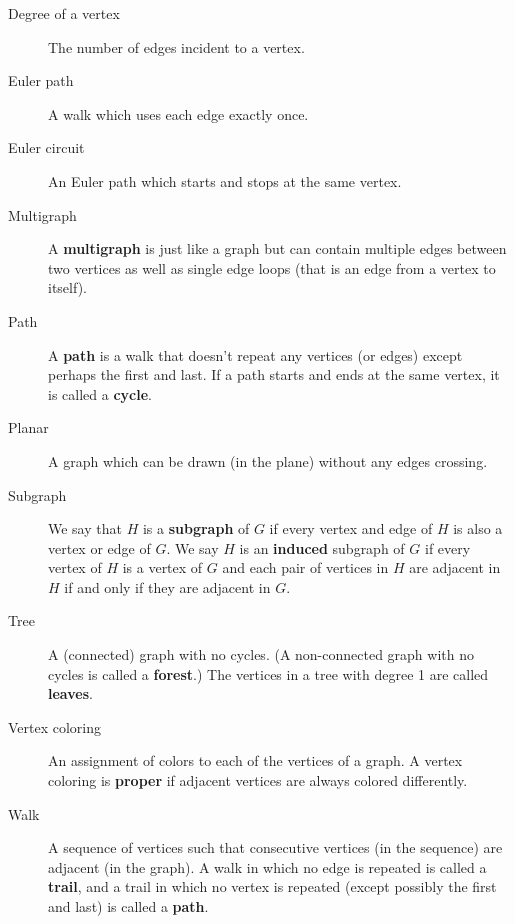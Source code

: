 \documentclass[10pt,]{book}
\newcommand{\terminology}[1]{\textbf{#1}}
\theoremstyle{plain}
\theoremstyle{definition}
\theoremstyle{definition}
\theoremstyle{definition}
\numberwithin{equation}{chapter}
\begin{document}
\begin{description}
\item[{Degree of a vertex}]\hypertarget{li-56}{}\hypertarget{p-1349}{}%
 The number of edges incident to a vertex.%
\item[{Euler path}]\hypertarget{li-57}{}\hypertarget{p-1350}{}%
A walk which uses each edge exactly once.%
\item[{Euler circuit}]\hypertarget{li-58}{}\hypertarget{p-1351}{}%
 An Euler path which starts and stops at the same vertex.%
\item[{Multigraph}]\hypertarget{li-59}{}\hypertarget{p-1352}{}%
 A \terminology{multigraph} is just like a graph but can contain multiple edges between two vertices as well as single edge loops (that is an edge from a vertex to itself).%
\item[{Path}]\hypertarget{li-60}{}\hypertarget{p-1353}{}%
A \terminology{path} is a walk that doesn't repeat any vertices (or edges) except perhaps the first and last.  If a path starts and ends at the same vertex, it is called a \terminology{cycle}.%
\item[{Planar}]\hypertarget{li-61}{}\hypertarget{p-1354}{}%
 A graph which can be drawn (in the plane) without any edges crossing.%
\item[{Subgraph}]\hypertarget{li-62}{}\hypertarget{p-1355}{}%
 We say that \(H\) is a \terminology{subgraph} of \(G\) if every vertex and edge of \(H\) is also a vertex or edge of \(G\). We say \(H\) is an \terminology{induced} subgraph of \(G\) if every vertex of \(H\) is a vertex of \(G\) and each pair of vertices in \(H\) are adjacent in \(H\) if and only if they are adjacent in \(G\).%
\item[{Tree}]\hypertarget{li-63}{}\hypertarget{p-1356}{}%
 A (connected) graph with no cycles. (A non-connected graph with no cycles is called a \terminology{forest}.) The vertices in a tree with degree 1 are called \terminology{leaves}.%
\item[{Vertex coloring}]\hypertarget{li-64}{}\hypertarget{p-1357}{}%
 An assignment of colors to each of the vertices of a graph. A vertex coloring is \terminology{proper} if adjacent vertices are always colored differently.%
\item[{Walk}]\hypertarget{li-65}{}\hypertarget{p-1358}{}%
 A sequence of vertices such that consecutive vertices (in the sequence) are adjacent (in the graph). A walk in which no edge is repeated is called a \terminology{trail}, and a trail in which no vertex is repeated (except possibly the first and last) is called a \terminology{path}.%
\end{description}
%
\typeout{************************************************}
\typeout{************************************************}
\end{document}
